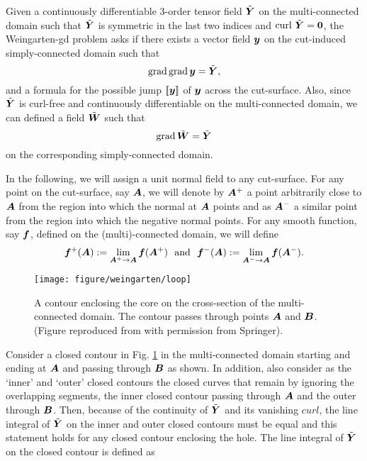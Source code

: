 \documentclass[11pt,letterpaper]{article}
\begin{document}
Given a continuously differentiable 3-order tensor field $\tilde{\bfY}$ on the multi-connected domain such that $\tilde{\bfY}$ is symmetric in the last two indices and $\curl \, \tilde{\bfY} = \bf0$, the Weingarten-gd problem asks if there exists a vector field $\bfy$ on the cut-induced simply-connected domain such that 
\begin{equation*}
\grad  \grad \bfy = \tilde{\bfY},
\end{equation*}
and a formula for the possible jump $[\![ \bfy ]\!]$ of $\bfy$ across the cut-surface. Also, since $\tilde{\bfY}$ is curl-free and continuously differentiable on the multi-connected domain, we can defined a field $\tilde{\bfW}$ such that 
\[
\grad \tilde{\bfW} = \tilde{\bfY}
\]
on the corresponding simply-connected domain. 

In the following, we will assign a unit normal field to any cut-surface. For any point on the cut-surface, say $\bfA$, we will denote by $\bfA^+$ a point arbitrarily close to $\bfA$ from the region into which the normal at $\bfA$ points and as $\bfA^-$ a similar point from the region into which the negative normal points. For any smooth function, say $\bff$, defined on the (multi)-connected domain, we will define 
\begin{equation}\label{+-}
\bff^+(\bfA) := \lim_{\bfA^+ \rightarrow \bfA} \bff(\bfA^+) \ \ \mbox{and} \ \   \bff^-(\bfA) := \lim_{\bfA^- \rightarrow \bfA} \bff(\bfA^-).
\end{equation}

\begin{figure}
\centering
\texttt{[image: figure/weingarten/loop]}
\caption{A contour enclosing the core on the cross-section of the multi-connected domain. The contour passes through points $\bfA$ and $\bfB$. (Figure reproduced from \cite{acharya2015continuum} with permission from Springer).}
\label{fig:loop}
\end{figure}

Consider a closed contour in Fig. \ref{fig:loop} in the multi-connected domain starting and ending at $\bfA$ and passing through $\bfB$ as shown. In addition, also consider as the `inner' and `outer' closed contours the closed curves that remain by ignoring the overlapping segments, the inner closed contour passing through $\bfA$ and the outer through $\bfB$. Then, because of the continuity of $\tilde{\bfY}$ and its vanishing $curl$, the line integral of $\tilde{\bfY}$ on the inner and outer closed contours must be equal and this statement holds for any closed contour enclosing the hole. The line integral of $\tilde{\bfY}$ on the closed contour is defined as
\end{document}
